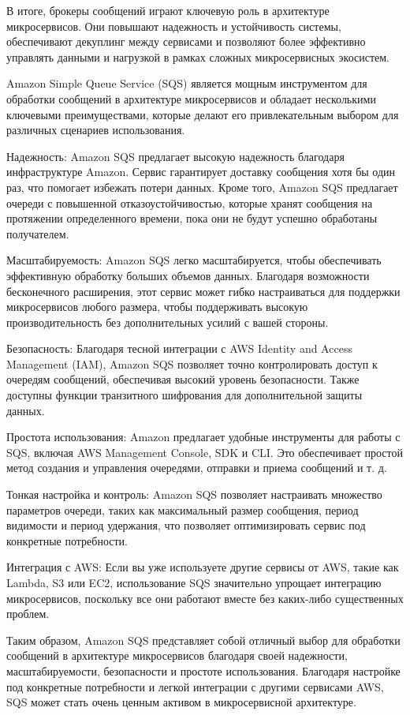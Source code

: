 В итоге, брокеры сообщений играют ключевую роль в архитектуре микросервисов. Они повышают надежность и устойчивость системы, обеспечивают декуплинг между сервисами и позволяют более эффективно управлять данными и нагрузкой в рамках сложных микросервисных экосистем.

Amazon Simple Queue Service (SQS) является мощным инструментом для обработки сообщений в архитектуре микросервисов и обладает несколькими ключевыми преимуществами, которые делают его привлекательным выбором для различных сценариев использования.

Надежность: Amazon SQS предлагает высокую надежность благодаря инфраструктуре Amazon. Сервис гарантирует доставку сообщения хотя бы один раз, что помогает избежать потери данных. Кроме того, Amazon SQS предлагает очереди с повышенной отказоустойчивостью, которые хранят сообщения на протяжении определенного времени, пока они не будут успешно обработаны получателем.

Масштабируемость: Amazon SQS легко масштабируется, чтобы обеспечивать эффективную обработку больших объемов данных. Благодаря возможности бесконечного расширения, этот сервис может гибко настраиваться для поддержки микросервисов любого размера, чтобы поддерживать высокую производительность без дополнительных усилий с вашей стороны.

Безопасность: Благодаря тесной интеграции с AWS Identity and Access Management (IAM), Amazon SQS позволяет точно контролировать доступ к очередям сообщений, обеспечивая высокий уровень безопасности. Также доступны функции транзитного шифрования для дополнительной защиты данных.

Простота использования: Amazon предлагает удобные инструменты для работы с SQS, включая AWS Management Console, SDK и CLI. Это обеспечивает простой метод создания и управления очередями, отправки и приема сообщений и т. д.

Тонкая настройка и контроль: Amazon SQS позволяет настраивать множество параметров очереди, таких как максимальный размер сообщения, период видимости и период удержания, что позволяет оптимизировать сервис под конкретные потребности.

Интеграция с AWS: Если вы уже используете другие сервисы от AWS, такие как Lambda, S3 или EC2, использование SQS значительно упрощает интеграцию микросервисов, поскольку все они работают вместе без каких-либо существенных проблем.

Таким образом, Amazon SQS представляет собой отличный выбор для обработки сообщений в архитектуре микросервисов благодаря своей надежности, масштабируемости, безопасности и простоте использования. Благодаря настройке под конкретные потребности и легкой интеграции с другими сервисами AWS, SQS может стать очень ценным активом в микросервисной архитектуре.